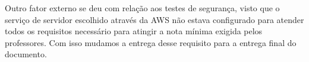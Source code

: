 \documentclass[
    12pt,               %
    openright,          %
    oneside,
    a4paper,            %
    BIBLATEX,           %
    TODO,               %
    english,            %
    brazil              %
    ]{ifsp-spo-inf-ctds}
\begin{document}
    Outro fator externo se deu com relação aos testes de segurança, visto que o serviço de servidor escolhido através da AWS não estava configurado para atender todos os requisitos necessário para atingir a nota mínima exigida pelos professores. Com isso mudamos a entrega desse requisito para a entrega final do documento.
        



\postextual


%






\end{document}
